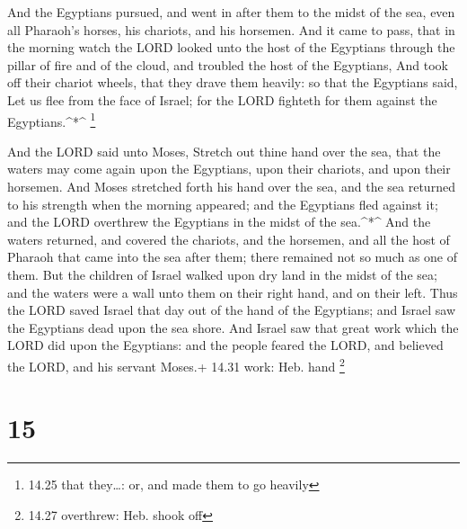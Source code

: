  And the Egyptians pursued, and went in after them to the
midst of the sea, even all Pharaoh's horses, his chariots, and his
horsemen.  And it came to pass, that in the morning watch
the LORD looked unto the host of the Egyptians through the pillar of
fire and of the cloud, and troubled the host of the Egyptians,
 And took off their chariot wheels, that they drave them
heavily: so that the Egyptians said, Let us flee from the face of
Israel; for the LORD fighteth for them against the Egyptians.\^{}*\^{}
\footnote{14.25 that they\ldots: or, and made them to go heavily}

 And the LORD said unto Moses, Stretch out thine hand over
the sea, that the waters may come again upon the Egyptians, upon their
chariots, and upon their horsemen.  And Moses stretched
forth his hand over the sea, and the sea returned to his strength when
the morning appeared; and the Egyptians fled against it; and the LORD
overthrew the Egyptians in the midst of the sea.\^{}*\^{} 
And the waters returned, and covered the chariots, and the horsemen, and
all the host of Pharaoh that came into the sea after them; there
remained not so much as one of them.  But the children of
Israel walked upon dry land in the midst of the sea; and the waters were
a wall unto them on their right hand, and on their left. 
Thus the LORD saved Israel that day out of the hand of the Egyptians;
and Israel saw the Egyptians dead upon the sea shore.  And
Israel saw that great work which the LORD did upon the Egyptians: and
the people feared the LORD, and believed the LORD, and his servant
Moses.+ 14.31 work: Heb. hand \footnote{14.27 overthrew: Heb. shook off}

\hypertarget{section-14}{%
\section{15}\label{section-14}}

